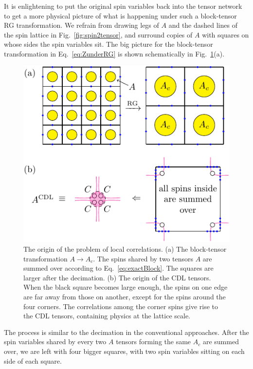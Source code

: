 \documentclass[aps,prr,reprint,superscriptaddress,nofootinbib,floatfix]{revtex4-2}
\begin{document}
%
It is enlightening to put the original spin variables back into the tensor network to get a more physical picture of what is happening under such a block-tensor RG transformation. 
We refrain from drawing legs of $A$ and the dashed lines of the spin lattice in Fig.~\ref{fig:spin2tensor}, and surround copies of $A$ with squares on whose sides the spin variables sit. 
The big picture for the block-tensor transformation in Eq.~\eqref{eq:ZunderRG} is shown schematically in Fig.~\ref{fig:rgschem}(a).
%
\begin{figure}[t]
    \includegraphics[scale=0.9,valign=c]{rgschem.pdf}
    \caption{\label{fig:rgschem}
        The origin of the problem of local correlations.
        (a) The block-tensor transformation $A\rightarrow A_c$. 
        The spins shared by two tensors $A$ are summed over according to Eq.~\eqref{eq:exactBlock}. 
        The squares are larger after the decimation.
        (b) The origin of the
        CDL tensors. When the black square becomes large enough, the
        spins on one edge are far away from those on another, except for
        the spins around the four corners. The correlations among the
corner spins give rise to the CDL tensors, containing physics at the
lattice scale.
} 
\end{figure}
%
The process is similar to the decimation in the conventional approaches.
After the spin variables shared by every two $A$ tensors forming the same $A_c$ are summed over, we are left with four bigger squares, with two spin variables sitting on each side of each square.
\end{document}
